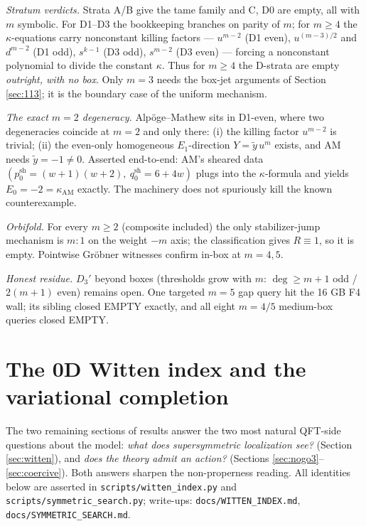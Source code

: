 \documentclass[11pt]{article}
\theoremstyle{definition}
\theoremstyle{remark}
\begin{document}
\emph{Stratum verdicts.} Strata A/B give the tame family and C, D0 are
empty, all with $m$ symbolic. For D1--D3 the bookkeeping branches on
parity of $m$; for $m\ge 4$ the $\kappa$-equations carry nonconstant
killing factors --- $u^{m-2}$ (D1 even), $u^{(m-3)/2}$ and $d^{m-2}$
(D1 odd), $s^{k-1}$ (D3 odd), $s^{m-2}$ (D3 even) --- forcing a
nonconstant polynomial to divide the constant $\kappa$. Thus for
$m\ge 4$ the D-strata are empty \emph{outright, with no box}. Only
$m=3$ needs the box-jet arguments of Section \ref{sec:113}; it is the
boundary case of the uniform mechanism.

\emph{The exact $m=2$ degeneracy.} Alp\"oge--Mathew sits in D1-even,
where two degeneracies coincide at $m=2$ and only there: (i) the
killing factor $u^{m-2}$ is trivial; (ii) the even-only homogeneous
$E_1$-direction $Y=\tilde y\, u^m$ exists, and AM needs
$\tilde y=-1\neq 0$. Asserted end-to-end: AM's sheared data
$(p_0^{\mathrm{sh}}=(w{+}1)(w{+}2),\ q_0^{\mathrm{sh}}=6{+}4w)$
plugs into the $\kappa$-formula and yields $E_0=-2=\kappa_{\mathrm{AM}}$
exactly. The machinery does not spuriously kill the known
counterexample.

\emph{Orbifold.} For every $m\ge 2$ (composite included) the only
stabilizer-jump mechanism is $m{:}1$ on the weight $-m$ axis; the
classification gives $R\equiv 1$, so it is empty. Pointwise Gr\"obner
witnesses confirm in-box at $m=4,5$.

\emph{Honest residue.} $D_3'$ beyond boxes (thresholds grow with $m$:
$\deg\ge m{+}1$ odd / $2(m{+}1)$ even) remains open. One targeted
$m=5$ gap query hit the 16 GB F4 wall; its sibling closed EMPTY
exactly, and all eight $m=4/5$ medium-box queries closed EMPTY.

\section{The 0D Witten index and the variational completion}
\label{sec:susy}

The two remaining sections of results answer the two most natural
QFT-side questions about the model: \emph{what does supersymmetric
localization see?} (Section \ref{sec:witten}), and \emph{does the
theory admit an action?} (Sections \ref{sec:nogo3}--\ref{sec:coercive}).
Both answers sharpen the non-properness reading. All identities below
are asserted in \texttt{scripts/witten\_index.py} and
\texttt{scripts/symmetric\_search.py}; write-ups:
\texttt{docs/WITTEN\_INDEX.md}, \texttt{docs/SYMMETRIC\_SEARCH.md}.
\end{document}
